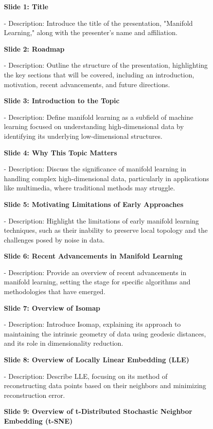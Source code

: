 \documentclass[letterpaper]{article} %
\begin{document}
\begin{figure}
\begin{tcolorbox}[colback=gray!10,colframe=blue!70,title=Slide Plan Case Study ,fonttitle=\bfseries]

\textbf{Slide 1: Title}

- Description: Introduce the title of the presentation, "Manifold Learning," along with the presenter's name and affiliation.

\textbf{Slide 2: Roadmap}

- Description: Outline the structure of the presentation, highlighting the key sections that will be covered, including an introduction, motivation, recent advancements, and future directions.

\textbf{Slide 3: Introduction to the Topic}

- Description: Define manifold learning as a subfield of machine learning focused on understanding high-dimensional data by identifying its underlying low-dimensional structures.

\textbf{Slide 4: Why This Topic Matters}

- Description: Discuss the significance of manifold learning in handling complex high-dimensional data, particularly in applications like multimedia, where traditional methods may struggle.

\textbf{Slide 5: Motivating Limitations of Early Approaches}

- Description: Highlight the limitations of early manifold learning techniques, such as their inability to preserve local topology and the challenges posed by noise in data.

\textbf{Slide 6: Recent Advancements in Manifold Learning}

- Description: Provide an overview of recent advancements in manifold learning, setting the stage for specific algorithms and methodologies that have emerged.

\textbf{Slide 7: Overview of Isomap}

- Description: Introduce Isomap, explaining its approach to maintaining the intrinsic geometry of data using geodesic distances, and its role in dimensionality reduction.

\textbf{Slide 8: Overview of Locally Linear Embedding (LLE)}

- Description: Describe LLE, focusing on its method of reconstructing data points based on their neighbors and minimizing reconstruction error.

\textbf{Slide 9: Overview of t-Distributed Stochastic Neighbor Embedding (t-SNE)}


\end{tcolorbox}
\end{figure}
\end{document}
